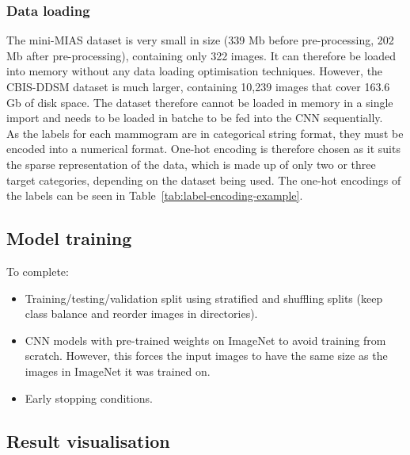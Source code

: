\subsubsection{Data loading}

The mini-MIAS dataset is very small in size (339 Mb before pre-processing, 202 Mb after pre-processing), containing only 322 images. It can therefore be loaded into memory without any data loading optimisation techniques. However, the CBIS-DDSM dataset is much larger, containing 10,239 images that cover 163.6 Gb of disk space. The dataset therefore cannot be loaded in memory in a single import and needs to be loaded in batche to be fed into the CNN sequentially.\\ %

As the labels for each mammogram are in categorical string format, they must be encoded into a numerical format. One-hot encoding is therefore chosen as it suits the sparse representation of the data, which is made up of only two or three target categories, depending on the dataset being used. The one-hot encodings of the labels can be seen in Table~\ref{tab:label-encoding-example}.




\subsection{Model training}

To complete:
\begin{itemize}
    \item Training/testing/validation split using stratified and shuffling splits (keep class balance and reorder images in directories).
    \item CNN models with pre-trained weights on ImageNet to avoid training from scratch. However, this  forces the input images to have the same size as the images in ImageNet it was trained on.
    \item Early stopping conditions.
\end{itemize}


\subsection{Result visualisation}
\label{sec:design-results-visualisation}

